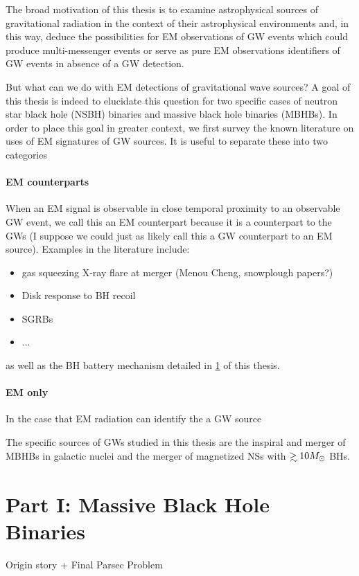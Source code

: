 The broad motivation of this thesis is to examine astrophysical sources of gravitational radiation in the context of their astrophysical environments and, in this way, deduce the possibilities for EM observations of GW events which could produce multi-messenger events or serve as pure EM observations identifiers of GW events in absence of a GW detection.


But what can we do with EM detections of gravitational wave sources? A goal of this thesis is indeed to elucidate this question for two specific cases of neutron star black hole (NSBH) binaries and massive black hole binaries (MBHBs). In order to place this goal in greater context, we first survey the known literature on uses of EM signatures of GW sources. It is useful to separate these into two categories

\paragraph{EM counterparts} When an EM signal is observable in close temporal proximity to an observable GW event, we call this an EM counterpart because it is a counterpart to the GWs (I suppose we could just as likely call this a GW counterpart to an EM source). Examples in the literature include:
\begin{itemize}
\item gas squeezing X-ray flare at merger (Menou Cheng, snowplough papers?)
\item Disk response to BH recoil
\item SGRBs
\item ...
\end{itemize}
as well as the BH battery mechanism detailed in \ref{} of this thesis.

\paragraph{EM only} In the case that EM radiation can identify the a GW source 

 






The specific sources of GWs studied in this thesis are the inspiral and merger of MBHBs in galactic nuclei and the merger of magnetized NSs with $\gsim 10 \Msun$ BHs.
\section{Part I: Massive Black Hole Binaries}
Origin story + Final Parsec Problem

